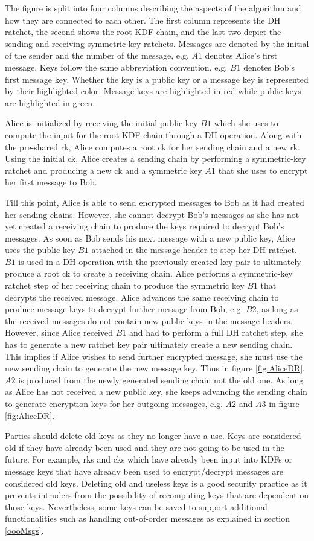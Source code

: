 The figure is split into four columns describing the aspects of the algorithm and how they are connected to each other. The first column represents the DH ratchet, the second shows the root KDF chain, and the last two depict the sending and receiving symmetric-key ratchets. Messages are denoted by the initial of the sender and the number of the message, e.g. $A1$ denotes Alice's first message. Keys follow the same abbreviation convention, e.g. $B1$ denotes Bob's first message key. Whether the key is a public key or a message key is represented by their highlighted color. Message keys are highlighted in red while public keys are highlighted in green.
\par
Alice is initialized by receiving the initial public key $B1$ which she uses to compute the input for the root KDF chain through a DH operation. Along with the pre-shared \gls{rk}, Alice computes a root \gls{ck} for her sending chain and a new \gls{rk}. Using the initial \gls{ck}, Alice creates a sending chain by performing a symmetric-key ratchet and producing a new \gls{ck} and a symmetric key $A1$ that she uses to encrypt her first message to Bob.
\par
Till this point, Alice is able to send encrypted messages to Bob as it had created her sending chains. However, she cannot decrypt Bob's messages as she has not yet created a receiving chain to produce the keys required to decrypt Bob's messages. As soon as Bob sends his next message with a new public key, Alice uses the public key $B1$ attached in the message header to step her DH ratchet. $B1$ is used in a DH operation with the previously created key pair to ultimately produce a root \gls{ck} to create a receiving chain. Alice performs a symmetric-key ratchet step of her receiving chain to produce the symmetric key $B1$ that decrypts the received message. Alice advances the same receiving chain to produce message keys to decrypt further message from Bob, e.g. $B2$, as long as the received messages do not contain new public keys in the message headers. However, since Alice received $B1$ and had to perform a full DH ratchet step, she has to generate a new ratchet key pair ultimately create a new sending chain. This implies if Alice wishes to send further encrypted message, she must use the new sending chain to generate the new message key. Thus in figure \ref{fig:AliceDR}, $A2$ is produced from the newly generated sending chain not the old one. As long as Alice has not received a new public key, she keeps advancing the sending chain to generate encryption keys for her outgoing messages, e.g. $A2$ and $A3$ in figure \ref{fig:AliceDR}.
\par
Parties should delete old keys as they no longer have a use. Keys are considered old if they have already been used and they are not going to be used in the future. For example, \gls{rk}s and \gls{ck}s which have already been input into KDFs or message keys that have already been used to encrypt/decrypt messages are considered old keys. Deleting old and useless keys is a good security practice as it prevents intruders from the possibility of recomputing keys that are dependent on those keys. Nevertheless, some keys can be saved to support additional functionalities such as handling out-of-order messages as explained in section \ref{oooMsgs}.

